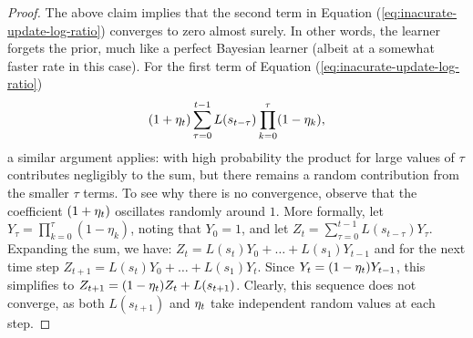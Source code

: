 \begin{proof}
    The above claim implies that the second term in Equation (\ref{eq:inacurate-update-log-ratio}) converges to zero almost surely. In other words, the learner forgets the prior, much like a perfect Bayesian learner (albeit at a somewhat faster rate in this case). For the first term of Equation (\ref{eq:inacurate-update-log-ratio})
    $$(1 + \eta_t)\sum_{\tau=0}^{t-1} L(s_{t - \tau}) \prod_{k=0}^\tau (1 - \eta_k),$$
    a similar argument applies: 
    with high probability the product for large values of $\tau$ contributes negligibly to the sum, but there remains a random contribution from the smaller $\tau$ terms.  
    To see why there is no convergence, observe that the coefficient $(1 + \eta_t)$ oscillates randomly around $1$. More formally, let 
    $Y_\tau = \prod_{k=0}^\tau (1 - \eta_k)$, noting that $Y_0 = 1$, and let $Z_t  = \sum_{\tau=0}^{t-1}L(s_{t-\tau})Y_\tau$. Expanding the sum, we have: $Z_t = L(s_t)Y_0 + \dots + L(s_1)Y_{t-1}$ and for the next time step $Z_{t+1} = L(s_t)Y_0 + \dots + L(s_1)Y_{t}$. Since $Y_t = (1-\eta_t)Y_{t-1}$, this simplifies to $Z_{t+1} = (1 - \eta_t)Z_t + L(s_{t+1})$. 
    Clearly, this sequence does not converge, as both $L(s_{t+1})$ and $\eta_t$ take independent random values at each step.
\end{proof}
